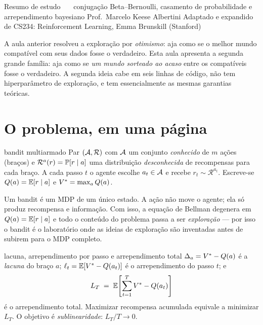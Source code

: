 \documentclass[11pt, a4paper]{article}
\begin{document}
     {Resumo de estudo \ \textbullet\ \ conjugação Beta--Bernoulli, casamento de
      probabilidade e arrependimento bayesiano}
     {Prof.\ Marcelo Keese Albertini}
     {Adaptado e expandido de CS234: Reinforcement Learning, Emma Brunskill (Stanford)}

\begin{ideiabox}
A aula anterior resolveu a exploração por \emph{otimismo}: aja como se o melhor
mundo compatível com seus dados fosse o verdadeiro. Esta aula apresenta a
segunda grande família: aja como se \emph{um mundo sorteado ao acaso} entre os
compatíveis fosse o verdadeiro. A segunda ideia cabe em seis linhas de código,
não tem hiperparâmetro de exploração, e tem essencialmente as mesmas garantias
teóricas.
\end{ideiabox}

\section{O problema, em uma página}

\begin{defbox}{bandit multiarmado}
Par $(\mathcal{A}, \mathcal{R})$ com $\mathcal{A}$ um conjunto \emph{conhecido} de $m$ ações
(braços) e $\mathcal{R}^a(r) = \mathbb{P}[r \mid a]$ uma distribuição
\emph{desconhecida} de recompensas para cada braço. A cada passo $t$ o agente
escolhe $a_t \in \mathcal{A}$ e recebe $r_t \sim \mathcal{R}^{a_t}$. Escreve-se
$Q(a) = \mathbb{E}[r \mid a]$ e $V^{*} = \max_a Q(a)$.
\end{defbox}

Um bandit é um MDP de um único estado. A ação não move o agente; ela só produz
recompensa e informação. Com isso, a equação de Bellman degenera em
$Q(a) = \mathbb{E}[r\mid a]$ e todo o conteúdo do problema passa a ser \emph{exploração}
— por isso o bandit é o laboratório onde as ideias de exploração são inventadas
antes de subirem para o MDP completo.

\begin{defbox}{lacuna, arrependimento por passo e arrependimento total}
$\Delta_a = V^{*} - Q(a)$ é a \emph{lacuna} do braço $a$;
$\ell_t = \mathbb{E}[V^{*} - Q(a_t)]$ é o arrependimento do passo $t$; e
\[
  L_T \;=\; \mathbb{E}\!\left[\sum_{t=1}^{T} V^{*} - Q(a_t)\right]
\]
é o arrependimento total. Maximizar recompensa acumulada equivale a minimizar
$L_T$. O objetivo é \emph{sublinearidade}: $L_T/T \to 0$.
\end{defbox}
\end{document}
